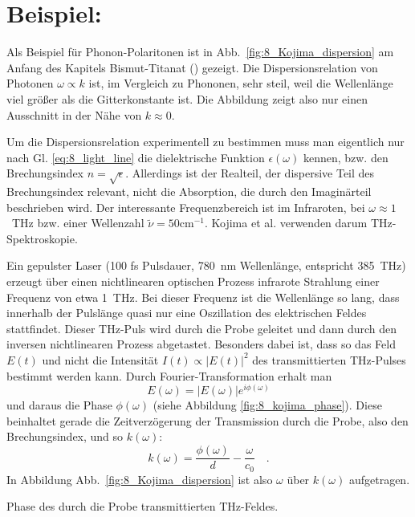 \section*{Beispiel: }

Als Beispiel für Phonon-Polaritonen ist in Abb.~\ref{fig:8_Kojima_dispersion} 
am Anfang des Kapitels Bismut-Titanat () gezeigt. Die Dispersionsrelation von Photonen $\omega \propto k$ ist, im Vergleich zu Phononen, sehr steil, weil die Wellenlänge viel größer als die Gitterkonstante ist. Die Abbildung zeigt also nur einen Ausschnitt in der Nähe von $k\approx 0$. 

Um die Dispersionsrelation experimentell zu bestimmen muss man eigentlich nur nach Gl. \ref{eq:8_light_line} die dielektrische Funktion $\epsilon(\omega)$ kennen, bzw. den Brechungsindex $n = \sqrt{\epsilon}$. Allerdings ist der Realteil, der dispersive Teil des Brechungsindex relevant, nicht die Absorption, die durch den Imaginärteil beschrieben wird. Der interessante Frequenzbereich ist im Infraroten, bei $\omega \approx 1$~THz bzw. einer Wellenzahl $\tilde{\nu} = 50$cm$^{-1}$. Kojima et al.  verwenden darum THz-Spektroskopie.

Ein gepulster Laser (100 fs Pulsdauer, 780~nm Wellenlänge, entspricht 385~THz) erzeugt über einen nichtlinearen optischen Prozess infrarote Strahlung einer Frequenz von etwa 1~THz. Bei dieser Frequenz ist die Wellenlänge so lang, dass innerhalb der Pulslänge quasi nur eine Oszillation des elektrischen Feldes stattfindet. Dieser THz-Puls wird durch die Probe geleitet und dann durch den inversen nichtlinearen Prozess abgetastet. Besonders dabei ist, dass so das Feld $E(t)$ und nicht die Intensität $I(t) \propto |E(t)|^2$ des transmittierten THz-Pulses bestimmt werden kann. Durch Fourier-Transformation erhalt man 
\begin{equation}
    E(\omega) = |E(\omega)| e^{i \phi(\omega)}
\end{equation}
und daraus die Phase $\phi(\omega)$ (siehe Abbildung \ref{fig:8_kojima_phase}). Diese beinhaltet gerade die Zeitverzögerung der Transmission durch die Probe, also den Brechungsindex, und so $k(\omega)$:
\begin{equation}
    k(\omega) = \frac{\phi(\omega)}{d} - \frac{\omega}{c_0} \quad .
\end{equation}
In Abbildung  Abb.~\ref{fig:8_Kojima_dispersion}  ist also $\omega$ über $ k(\omega)$ aufgetragen.

\begin{marginfigure}
    \caption{Phase des durch die Probe transmittierten THz-Feldes. \label{fig:8_kojima_phase}
    }
\end{marginfigure}

